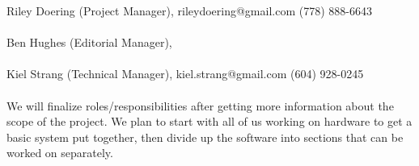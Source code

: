 Riley Doering (Project Manager), rileydoering@gmail.com (778) 888-6643\\\\
Ben Hughes (Editorial Manager), \\\\
Kiel Strang (Technical Manager), kiel.strang@gmail.com (604) 928-0245\\\\

We will finalize roles/responsibilities after getting more information about the scope of the project.  We plan to start with all of us working on hardware to get a basic system put together, then divide up the software into sections that can be worked on separately.